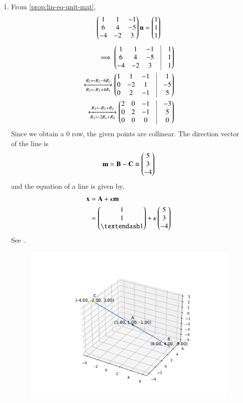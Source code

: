 \begin{enumerate}
	\item From 
		\eqref{prop:lin-eq-unit-mat},
\begin{align}
\begin{pmatrix}1&1&-1\\ 6&4&-5\\ -4&-2&3\end{pmatrix} \mathbf{n} = \begin{pmatrix}1\\1\\1\end{pmatrix}
\end{align}
\begin{align*}
	\implies \myvec{1&1&-1&\vrule&1\\6&4&-5&\vrule&1\\-4&-2&3&\vrule&1}
	\\
\xleftrightarrow[R_3 \leftarrow R_3 + 4R_1]{R_2 \leftarrow R_2 - 6R_1}
\myvec{1&1&-1&\vrule&1\\0&-2&1&\vrule&-5\\0&2&-1&\vrule&5}\\ 
\xleftrightarrow[{R_1 \leftarrow 2R_1 + R_2}] {R_3 \leftarrow R_3 + R_2}
\myvec{2&0&-1&\vrule&-3\\0&2&-1&\vrule&5\\0&0&0&\vrule&0}
\end{align*}
Since we obtain a 0 row, 
the given points are collinear.
The direction vector of the line is
\begin{align}
\mathbf{m}=\mathbf{B}-\mathbf{C} \equiv \begin{pmatrix}5\\3\\-4\end{pmatrix}
\end{align}
and the equation of a line is given by,
\begin{align}
	\vec{x}&=\vec{A}+  \kappa\vec{m}\\
&= \myvec{1\\1\\– 1} + \kappa \myvec{5\\3\\-4}
\end{align}
See 
     .
\begin{figure}[H]
  \centering
   \includegraphics[width=0.75\columnwidth]{chapters/12/11/3/6/figs/fig.pdf}

\end{figure}
\end{enumerate}
